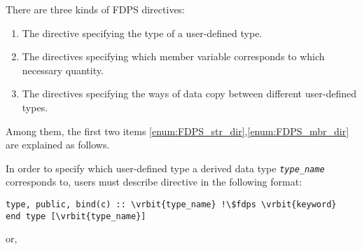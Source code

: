 There are three kinds of FDPS directives:
\begin{enumerate}[leftmargin=*,itemsep=-1ex,label=(\alph*)]
\item The directive specifying the type of a user-defined type. \label{enum:FDPS_str_dir}
\item The directives specifying which member variable corresponds to which necessary quantity. \label{enum:FDPS_mbr_dir}
\item The directives specifying the ways of data copy between different user-defined types. \label{enum:FDPS_meth_dir}
\end{enumerate}
Among them, the first two items \ref{enum:FDPS_str_dir},\ref{enum:FDPS_mbr_dir} are explained as follows.

In order to specify which user-defined type a derived data type \textit{\texttt{type\_name}} corresponds to, users must describe directive in the following format:
\begin{screen}
\begin{Verbatim}[commandchars=\\\{\}]
type, public, bind(c) :: \vrbit{type_name} !\$fdps \vrbit{keyword}
end type [\vrbit{type_name}]
\end{Verbatim}
\end{screen}

or,

